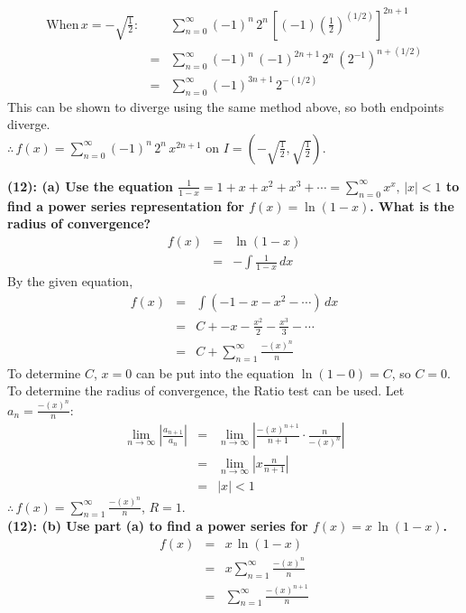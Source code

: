 \documentclass[12]{article}
\begin{document}
\begin{eqnarray}
\mathrm{When}\, x=-\sqrt{\frac{1}{2}}\mathrm{:}&&\sum\limits_{n=0}^\infty (-1)^n\, 2^n\, \left[(-1)\left(\frac{1}{2}\right)^{(1/2)}\right]^{2n+1}\\
&=& \sum\limits_{n=0}^\infty (-1)^n\, (-1)^{2n+1}\, 2^n\, (2^{-1})^{n+(1/2)}\\
&=& \sum\limits_{n=0}^\infty (-1)^{3n+1}\, 2^{-(1/2)}
\end{eqnarray}
This can be shown to diverge using the same method above, so both endpoints diverge.\\
$\displaystyle{
\therefore\, f(x) = \sum\limits_{n=0}^\infty (-1)^n\,2^n\,x^{2n+1}
}$ on 
$\displaystyle{
I = (-\sqrt{\frac{1}{2}},\sqrt{\frac{1}{2}})
}$.

\textbf{(12): (a) Use the equation
$\displaystyle{
\frac{1}{1-x} = 1 + x + x^2 + x^3 + \cdots = \sum\limits_{n=0}^\infty x^x,\, |x|<1
}$ to find a power series representation for 
$f(x)=\ln{(1-x)}$. What is the radius of convergence?
}\\
\begin{eqnarray}
f(x) &=& \ln{(1-x)}\\
&=& -\int \frac{1}{1-x} \, dx
\end{eqnarray}
By the given equation, 
\begin{eqnarray}
f(x) &=& \int (-1 - x - x^2 - \cdots)\, dx  \\
&=& C + -x -\frac{x^2}{2} - \frac{x^3}{3} - \cdots\\
&=& C + \sum\limits_{n=1}^\infty \frac{-(x)^n}{n}
\end{eqnarray}
To determine $C$, $x=0$ can be put into the equation $\ln{(1-0)}=C$, so $C=0$. To determine the radius of convergence, the Ratio test can be used. Let $\displaystyle{
a_n = \frac{-(x)^n}{n}
}$:
\begin{eqnarray}
\lim\limits_{n\to\infty} \left|\frac{a_{n+1}}{a_n}\right| &=& 
\lim\limits_{n\to\infty} \left| \frac{-(x)^{n+1}}{n+1}\cdot \frac{n}{-(x)^n}\right|\\
&=& \lim\limits_{n\to\infty} \left| x\frac{n}{n+1} \right|\\
&=& |x| < 1
\end{eqnarray}
$\displaystyle{
\therefore\, f(x) =  \sum\limits_{n=1}^\infty \frac{-(x)^n}{n}
}$, $R = 1$.\\

\textbf{(12): (b) Use part (a) to find a power series for $f(x)=x\,\ln{(1-x)}$.
}
\begin{eqnarray}
f(x) &=& x\,\ln{(1-x)}\\
&=& x\sum\limits_{n=1}^\infty \frac{-(x)^n}{n}\\
&=& \sum\limits_{n=1}^\infty \frac{-(x)^{n+1}}{n}
\end{eqnarray}
\end{document}
